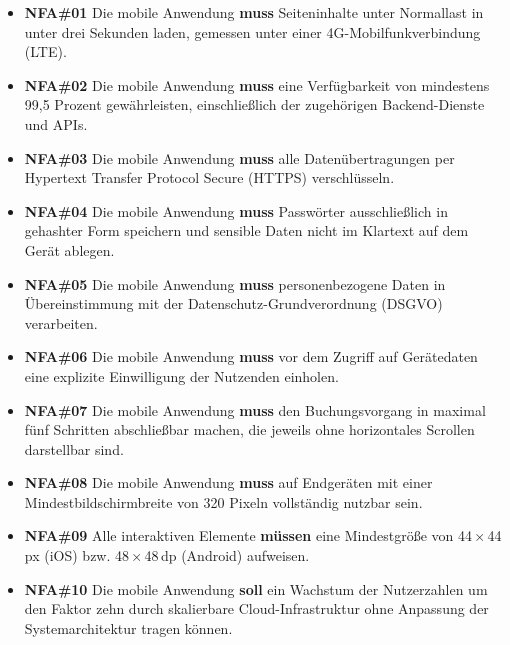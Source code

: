 \begin{itemize}
    \item \textbf{NFA\#01} Die mobile Anwendung \textbf{muss} Seiteninhalte unter Normallast in unter drei Sekunden laden, gemessen unter einer 4G-Mobilfunkverbindung (LTE).

    \item \textbf{NFA\#02} Die mobile Anwendung \textbf{muss} eine 
    Verfügbarkeit von mindestens 99{,}5 Prozent gewährleisten, einschließlich der zugehörigen Backend-Dienste und APIs.

    \item \textbf{NFA\#03} Die mobile Anwendung \textbf{muss} alle 
    Datenübertragungen per Hypertext Transfer Protocol Secure (HTTPS) verschlüsseln.

    \item \textbf{NFA\#04} Die mobile Anwendung \textbf{muss} Passwörter 
    ausschließlich in gehashter Form speichern und sensible Daten nicht im Klartext auf dem Gerät ablegen.

    \item \textbf{NFA\#05} Die mobile Anwendung \textbf{muss} 
    personenbezogene Daten in Übereinstimmung mit der 
    Datenschutz-Grundverordnung (DSGVO) verarbeiten.

    \item \textbf{NFA\#06} Die mobile Anwendung \textbf{muss} vor dem 
    Zugriff auf Gerätedaten eine explizite Einwilligung der Nutzenden einholen.

    \item \textbf{NFA\#07} Die mobile Anwendung \textbf{muss} den 
    Buchungsvorgang in maximal fünf Schritten abschließbar machen, die 
    jeweils ohne horizontales Scrollen darstellbar sind.

    \item \textbf{NFA\#08} Die mobile Anwendung \textbf{muss} auf 
    Endgeräten mit einer Mindestbildschirmbreite von 320 Pixeln 
    vollständig nutzbar sein.

    \item \textbf{NFA\#09} Alle interaktiven Elemente \textbf{müssen} 
    eine Mindestgröße von 44\,×\,44\,px (iOS) bzw. 48\,×\,48\,dp 
    (Android) aufweisen.

    \item \textbf{NFA\#10} Die mobile Anwendung \textbf{soll} ein 
    Wachstum der Nutzerzahlen um den Faktor zehn durch skalierbare 
    Cloud-Infrastruktur ohne Anpassung der Systemarchitektur tragen können.
\end{itemize}

